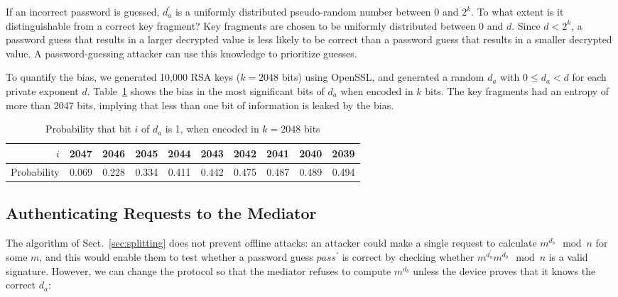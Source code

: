 \documentclass{llncs}
\begin{document}
If an incorrect password is guessed, $d_a^\prime$ is a uniformly distributed pseudo-random number
between 0 and $2^k$. To what extent is it distinguishable from a correct key fragment? Key fragments
are chosen to be uniformly distributed between 0 and $d$. Since $d < 2^k$, a password guess that
results in a larger decrypted value is less likely to be correct than a password guess that results
in a smaller decrypted value. A password-guessing attacker can use this knowledge to prioritize
guesses.

To quantify the bias, we generated 10,000 RSA keys ($k=2048$ bits) using OpenSSL, and generated a
random $d_a$ with $0 \le d_a < d$ for each private exponent $d$. Table~\ref{tab:bias} shows the bias
in the most significant bits of $d_a$ when encoded in $k$ bits. The key fragments had an entropy of
more than 2047 bits, implying that less than one bit of information is leaked by the bias.

\renewcommand{\arraystretch}{1.5}
\setlength\tabcolsep{4pt}
\begin{table}
\centering
\caption{Probability that bit $i$ of $d_a$ is 1, when encoded in $k=2048$ bits}\label{tab:bias}
\begin{tabular}{r|rrrrrrrrr}
$i$ & 2047 & 2046 & 2045 & 2044 & 2043 & 2042 & 2041 & 2040 & 2039 \\ \hline
Probability &
0.069 & 0.228 & 0.334 & 0.411 & 0.442 & 0.475 & 0.487 & 0.489 & 0.494
\end{tabular}
\end{table}

\subsection{Authenticating Requests to the Mediator}\label{sec:mediator-auth}

The algorithm of Sect.~\ref{sec:splitting} does not prevent offline attacks: an attacker could make
a single request to calculate $m^{d_b} \mod n$ for some $m$, and this would enable them to test
whether a password guess $\mathit{pass}^\prime$ is correct by checking whether
$m^{d_a^\prime} m^{d_b} \mod n$ is a valid signature. However, we can change the protocol so that
the mediator refuses to compute $m^{d_b}$ unless the device proves that it knows the correct $d_a$:
\end{document}
